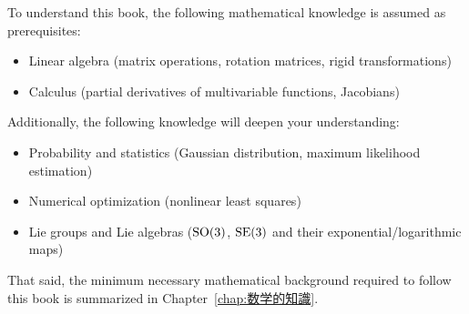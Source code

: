 To understand this book, the following mathematical knowledge is assumed as prerequisites:
%
\begin{itemize}
  \item Linear algebra (matrix operations, rotation matrices, rigid transformations)
  \item Calculus (partial derivatives of multivariable functions, Jacobians)
\end{itemize}
%
Additionally, the following knowledge will deepen your understanding:
%
\begin{itemize}
  \item Probability and statistics (Gaussian distribution, maximum likelihood estimation)
  \item Numerical optimization (nonlinear least squares)
  \item Lie groups and Lie algebras (${\rm SO}(3)$, ${\rm SE}(3)$ and their exponential/logarithmic maps)
\end{itemize}
%
That said, the minimum necessary mathematical background required to follow this book is summarized in Chapter~\ref{chap:数学的知識}.

